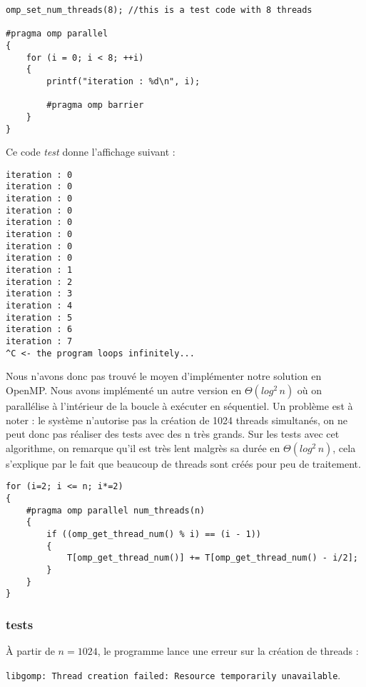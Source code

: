 \begin{lstlisting}[mathescape, style=cilk, title=Test d'exécution d'OpenMP d'une barrière dans une boucle.]
omp_set_num_threads(8); //this is a test code with 8 threads

#pragma omp parallel
{
    for (i = 0; i < 8; ++i)
    {
        printf("iteration : %d\n", i);

        #pragma omp barrier
    }
}
\end{lstlisting}

Ce code \textit{test} donne l'affichage suivant :

\begin{lstlisting}[mathescape, style=cilk, title=Résultats d'exécution avec une barrière OpenMP.]
iteration : 0
iteration : 0
iteration : 0
iteration : 0
iteration : 0
iteration : 0
iteration : 0
iteration : 0
iteration : 1
iteration : 2
iteration : 3
iteration : 4
iteration : 5
iteration : 6
iteration : 7
^C <- the program loops infinitely...
\end{lstlisting}

Nous n'avons donc pas trouvé le moyen d'implémenter notre solution en OpenMP. Nous avons implémenté un autre version en $ \Theta (log^2 \, n)$ où on parallélise à l'intérieur de la boucle à exécuter en séquentiel. Un problème est à noter : le système n'autorise pas la création de 1024 threads simultanés, on ne peut donc pas réaliser des tests avec des n très grands. Sur les tests avec cet algorithme, on remarque qu'il est très lent malgrès sa durée en $ \Theta (log^2 \, n)$, cela s'explique par le fait que beaucoup de threads sont créés pour peu de traitement.

\newpage
\begin{lstlisting}[mathescape, style=cilk, title=Partie du code modifier en OpenMP.]
for (i=2; i <= n; i*=2)
{
    #pragma omp parallel num_threads(n)
    {
        if ((omp_get_thread_num() % i) == (i - 1))
        {
            T[omp_get_thread_num()] += T[omp_get_thread_num() - i/2];
        }
    }
}
\end{lstlisting}

\subsubsection*{tests}


À partir de $n = 1024$, le programme lance une erreur sur la création de threads :
\begin{center}
\verb+libgomp: Thread creation failed: Resource temporarily unavailable+.
\end{center}

